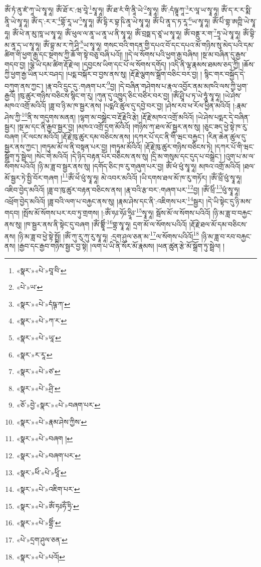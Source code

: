 ཨོཾ་ཏཾ་ནུ་ཛཾ་ཀཱ་ཡེ་སྭཱ་ཧཱ། ཨོཾ་ཐོ་ར་:ཝ་བཱེ་\footnote{«སྣར་»«པེ་»བཱ་བི་}སྭཱ་ཧཱ། ཨོཾ་ཐ་རཾ་གི་ནཱི་ཡེ་\footnote{«པེ་»ཡ་}སྭཱ་ཧཱ། ཨོཾ་:དཾཥྚཱ་ཀཱ་\footnote{«སྣར་»«པེ་»དཾཥྚ་ཀ་}ར་ལཱ་ཡ་སྭཱ་ཧཱ། ཨོཾ་ད་ར་ར་སྨི་ནཱི་ཡེ་སྭཱ་ཧཱ། ཨོཾ་ད་:ར་ར་\footnote{«སྣར་»«པེ་»ཀ་ར་}གྷོ་རཱ་ཡ་\footnote{«སྣར་»«པེ་»ཡཱ་}སྭཱ་ཧཱ། ཨོཾ་དྷི་ར་བྷ་ཥི་ནཱ་ཡེ་སྭཱ་ཧཱ། ཨོཾ་པི་ནཱ་ད་ཏ་རཱ་\footnote{«སྣར་»ར་རཱ་}ཡ་སྭཱ་ཧཱ། ཨོཾ་པིཾ་གྷ་ཨཀྵི་ཡེ་སྭཱ་ཧཱ། ཨོཾ་ཕེ་ན་མུ་ཁཱ་ཡ་སྭཱ་ཧཱ། ཨོཾ་ཕུལ་ལ་ནཱ་ཡ་ནཱ་ཡ་ནི་སྭཱ་ཧཱ། ཨོཾ་བྲཧྨ་ད་ཙཱ་ཡ་སྭཱ་ཧཱ། ཨོཾ་བནྡུ་ར་ག་\footnote{«སྣར་»«པེ་»ཙ་}ཏྲཱ་ཡེ་སྭཱ་ཧཱ། ཨོཾ་བྷི་མ་ནཱ་ད་ཡ་སྭཱ་ཧཱ། ཨོཾ་བྷྲ་མ་ར་ཀེ་ཤཱི་\footnote{«སྣར་»«པེ་»ཤྲི་}ཡ་སྭཱ་ཧཱ། གསང་བའི་གདན་གྱི་དཔའ་བོ་དང་དཔའ་མོ་གཉིས་སུ་མེད་པའི་དམ་ཚིག་གི་ཕྱག་རྒྱ་དང་སྔགས་ཀྱི་ཆོ་ག་སྟེ་བཅུ་བཞི་པའོ།། །།དེ་ལ་སོགས་པའི་ཕྱག་རྒྱ་བཞིས། །སྔ་མ་བཞིན་དུ་རྒྱས་གདབ་བྱ། །ལྕེ་ཡི་དམ་ཚིག་རྡོ་རྗེ་ལ། །དབྱངས་ཡིག་དང་པོ་ལ་སོགས་དགོད། །འདི་ནི་ལྷ་རྣམས་ཐམས་ཅད་ཀྱི། །ཆོས་ཀྱི་ཕྱག་རྒྱ་ཡིན་པར་བཤད། །པདྨ་བསྐོར་བ་བྱས་ནས་སུ། །རྡོ་རྗེ་ལྕགས་སྒྲོག་བཅིང་བར་བྱ། །
སྙིང་གར་བསྐྱོད་དེ་བཀུག་ནས་ཀྱང་། །རྣ་བའི་དྲུང་དུ་:གཞག་པར་\footnote{«ཅོ་»བྱེ་«སྣར་»«པེ་»བཞག་པར་}བྱ། །དེ་བཞིན་གཤེགས་པ་རྣལ་འབྱོར་ནམ་མཁའི་ལས་ཀྱི་ཕྱག་རྒྱའོ། །ཁུ་ཚུར་གཉིས་བཅིངས་སྙིང་ག་རུ། །ཀུན་དུ་འཁྱུད་ཅིང་བཙིར་བར་བྱ། །ཨོཾ་ཤྲཱི་པ་ཏ་ཡེ་ཧཱུཾ་སྭཱ་ཧཱ། །ཡེ་ཤེས་མཁའ་འགྲོ་མའིའོ། །ཟླ་བ་ཉི་མ་ཁ་སྦྱར་ནས། །པདྨའི་ཚུལ་དུ་དབྱེ་བར་བྱ། །ཤེས་རབ་ཕ་རོལ་ཕྱིན་མའིའོ། །:རྣམ་ཤེས་ཀྱི་\footnote{«སྣར་»«པེ་»རྣམ་ཤེས་ཀྱིས་}ནི་ས་གདུགས་མནན། །ལྷག་མ་བསྒྲེང་བ་རྡོ་རྗེའི་རྩེ། །རྡོ་རྗེ་མཁའ་འགྲོ་མའིའོ། །ཡེ་ཤེས་པདྨར་དེ་བཞིན་སྦྱར། །སྔ་མ་དང་ནི་རྒྱབ་སྦྱར་བྱ། །མཁའ་འགྲོ་དྲག་མོའིའོ། །གཉིས་ཀ་ཐལ་མོ་སྦྱར་ནས་སུ། །ཅུང་ཟད་ཕྱེ་སྟེ་ཁ་རུ་བཞག །རོ་ལངས་མའིའོ། །རྡོ་རྗེ་ཁུ་ཚུར་དམ་བཅིངས་ནས། །དཀར་པོ་དང་ནི་གི་ཝང་བརྐྱང་། །རིན་ཆེན་ཚུལ་དུ་སྦྱར་ནས་ཀྱང་། །གཏུམ་མོ་ལ་ནི་བསྟན་པར་བྱ། །གཏུམ་མོའིའོ། །རྡོ་རྗེ་ཁུ་ཚུར་གཉིས་བཅིངས་ཏེ། །དཀར་པོ་གི་ཝང་སྒྲོག་ཏུ་སྦྲེལ། །སེང་གེ་མའིའོ། །དེ་ཉིད་བརྟན་པོར་བཅིངས་ནས་སུ། །དྲི་མ་གསུམ་དང་དུད་པ་བསྒྲེང་། །འུག་པ་མ་ལ་སོགས་པའིའོ། །ཉི་མ་ཟླ་བ་སྦྱར་ནས་སུ། །དགོད་ཅིང་ཁ་རུ་གཞུག་པར་བྱ། ཨོཾ་ཕཾ་ཕུཾ་སྭཱ་ཧཱ། མཁའ་འགྲོ་མའིའོ། །ཐལ་མོ་སྦྱར་ཏེ་སྤྱི་བོར་གཞག །\footnote{«སྣར་»«པེ་»བཞག །}ཨོཾ་ཕེཾ་ཕུཾ་སྭཱ་ཧཱ། མེ་འབར་མའིའོ། །ཡི་དགས་ཐལ་མོ་ཁ་རུ་གཏོར། །ཨོཾ་ཕྲོཾ་ཕུཾ་སྭཱ་ཧཱ། འཇིབ་བྱེད་མའིའོ། །ཟླ་བ་ཁུ་ཚུར་བརྟན་བཅིངས་ནས། །རྣ་བའི་རྩ་བར་:གཞག་པར་\footnote{«སྣར་»«པེ་»བཞག་པར་}བྱ། །ཨོཾ་ཕྲིཾ་\footnote{«སྣར་»ཕིཾ་«པེ་»ཕཱིཾ་}ཕུཾ་སྭཱ་ཧཱ། འཕྲོག་བྱེད་མའིའོ། །ཟླ་བའི་ལག་པ་བརྐྱང་ནས་སུ། །རྣམ་ཤེས་དང་ནི་:འཇིགས་པར་\footnote{«སྣར་»«པེ་»འཇིག་པར་}སྦྱར། །དེ་ཡི་སྟེང་དུ་ཉི་མས་གདབ། །སྤོས་མོ་སོགས་པར་རབ་ཏུ་གྲགས། །:ཨོཾ་ཧཿ་ཧོཿ་ཧྲཱིཿ་\footnote{«སྣར་»«པེ་»ཨོཾ་ཧཿཧོཾ་ཧྲི་}སྭཱ་ཧཱ། སྦོས་མོ་ལ་སོགས་པའིའོ། །ཉི་མ་ཟླ་བ་བརྐྱང་ནས་སུ། །ཁ་སྦྱར་ནས་ནི་སྟེང་དུ་བཞག །ཨོཾ་གྷྲཱིཾ་\footnote{«སྣར་»«པེ་»གྷྲིཾ་}གྷྲ་སྭཱ་ཧཱ། དྲག་མོ་ལ་སོགས་པའིའོ། །རྡོ་རྗེ་ཐལ་མོ་དམ་བཅིངས་ནས། །ཉི་མ་ཟླ་བ་ཕྱེ་སྟེ་སྤྲོ། །ཨོཾ་ཀུ་རུ་ཀུ་རུ་སྭཱ་ཧཱ། :དྲག་ཤུལ་ཅན་མ་\footnote{«པེ་»དྲག་ཤུལ་ཅན་}ལ་སོགས་པའིའོ།\footnote{«སྣར་»«པེ་»པའོ།} །ཉི་མ་ཟླ་བ་རབ་བརྐྱང་ནས། །རྒྱབ་དང་རྒྱབ་གཉིས་སྦྱར་བྱ་སྟེ། །ལག་པ་ཡི་ནི་སོར་མོ་རྣམས། །ཕན་ཚུན་རྩེ་མོ་སྒྲོག་ཏུ་སྦྲེལ། །

